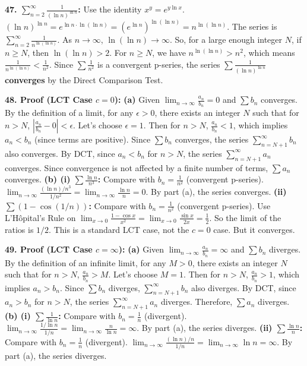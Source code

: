 \documentclass{article}
\begin{document}
\textbf{47. \(\sum_{n=2}^{\infty} \frac{1}{(\ln n)^{\ln n}}\):} Use the identity \(x^y = e^{y \ln x}\).
\((\ln n)^{\ln n} = e^{\ln n \cdot \ln(\ln n)} = (e^{\ln n})^{\ln(\ln n)} = n^{\ln(\ln n)}\).
The series is \(\sum_{n=2}^{\infty} \frac{1}{n^{\ln(\ln n)}}\).
As \(n \to \infty\), \(\ln(\ln n) \to \infty\). So, for a large enough integer \(N\), if \(n \ge N\), then \(\ln(\ln n) > 2\).
For \(n \ge N\), we have \(n^{\ln(\ln n)} > n^2\), which means \(\frac{1}{n^{\ln(\ln n)}} < \frac{1}{n^2}\).
Since \(\sum \frac{1}{n^2}\) is a convergent p-series, the series \(\sum \frac{1}{(\ln n)^{\ln n}}\) \textbf{converges} by the Direct Comparison Test.

\textbf{48. Proof (LCT Case \(c=0\)):}
\textbf{(a)} Given \(\lim_{n \to \infty} \frac{a_n}{b_n} = 0\) and \(\sum b_n\) converges. By the definition of a limit, for any \(\epsilon > 0\), there exists an integer \(N\) such that for \(n>N\), \(|\frac{a_n}{b_n} - 0| < \epsilon\). Let's choose \(\epsilon = 1\). Then for \(n > N\), \(\frac{a_n}{b_n} < 1\), which implies \(a_n < b_n\) (since terms are positive). Since \(\sum b_n\) converges, the series \(\sum_{n=N+1}^\infty b_n\) also converges. By DCT, since \(a_n < b_n\) for \(n>N\), the series \(\sum_{n=N+1}^\infty a_n\) converges. Since convergence is not affected by a finite number of terms, \(\sum a_n\) converges.
\textbf{(b) (i) \(\sum \frac{\ln n}{n^3}\):} Compare with \(b_n = \frac{1}{n^2}\) (convergent p-series). \(\lim_{n \to \infty} \frac{(\ln n)/n^3}{1/n^2} = \lim_{n \to \infty} \frac{\ln n}{n} = 0\). By part (a), the series converges.
\textbf{(ii) \(\sum (1-\cos(1/n))\):} Compare with \(b_n = \frac{1}{n^2}\) (convergent p-series). Use L'Hôpital's Rule on \(\lim_{x \to 0} \frac{1-\cos x}{x^2} = \lim_{x \to 0} \frac{\sin x}{2x} = \frac{1}{2}\). So the limit of the ratios is \(1/2\). This is a standard LCT case, not the \(c=0\) case. But it converges.

\textbf{49. Proof (LCT Case \(c=\infty\)):}
\textbf{(a)} Given \(\lim_{n \to \infty} \frac{a_n}{b_n} = \infty\) and \(\sum b_n\) diverges. By the definition of an infinite limit, for any \(M > 0\), there exists an integer \(N\) such that for \(n>N\), \(\frac{a_n}{b_n} > M\). Let's choose \(M=1\). Then for \(n>N\), \(\frac{a_n}{b_n} > 1\), which implies \(a_n > b_n\). Since \(\sum b_n\) diverges, \(\sum_{n=N+1}^\infty b_n\) also diverges. By DCT, since \(a_n > b_n\) for \(n>N\), the series \(\sum_{n=N+1}^\infty a_n\) diverges. Therefore, \(\sum a_n\) diverges.
\textbf{(b) (i) \(\sum \frac{1}{\ln n}\):} Compare with \(b_n = \frac{1}{n}\) (divergent). \(\lim_{n \to \infty} \frac{1/\ln n}{1/n} = \lim_{n \to \infty} \frac{n}{\ln n} = \infty\). By part (a), the series diverges.
\textbf{(ii) \(\sum \frac{\ln n}{n}\):} Compare with \(b_n = \frac{1}{n}\) (divergent). \(\lim_{n \to \infty} \frac{(\ln n)/n}{1/n} = \lim_{n \to \infty} \ln n = \infty\). By part (a), the series diverges.
\end{document}
